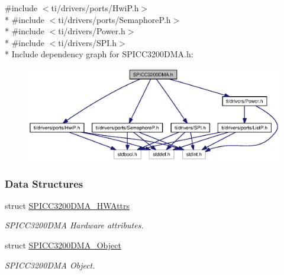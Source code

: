 {\ttfamily \#include $<$ti/drivers/ports/\+Hwi\+P.\+h$>$}\\*
{\ttfamily \#include $<$ti/drivers/ports/\+Semaphore\+P.\+h$>$}\\*
{\ttfamily \#include $<$ti/drivers/\+Power.\+h$>$}\\*
{\ttfamily \#include $<$ti/drivers/\+S\+P\+I.\+h$>$}\\*
Include dependency graph for S\+P\+I\+C\+C3200\+D\+M\+A.\+h\+:
\nopagebreak
\begin{figure}[H]
\begin{center}
\leavevmode
\includegraphics[width=350pt]{_s_p_i_c_c3200_d_m_a_8h__incl}
\end{center}
\end{figure}
\subsubsection*{Data Structures}
\begin{DoxyCompactItemize}
\item 
struct \hyperlink{struct_s_p_i_c_c3200_d_m_a___h_w_attrs}{S\+P\+I\+C\+C3200\+D\+M\+A\+\_\+\+H\+W\+Attrs}
\begin{DoxyCompactList}\small\item\em S\+P\+I\+C\+C3200\+D\+M\+A Hardware attributes. \end{DoxyCompactList}\item 
struct \hyperlink{struct_s_p_i_c_c3200_d_m_a___object}{S\+P\+I\+C\+C3200\+D\+M\+A\+\_\+\+Object}
\begin{DoxyCompactList}\small\item\em S\+P\+I\+C\+C3200\+D\+M\+A Object. \end{DoxyCompactList}\end{DoxyCompactItemize}
